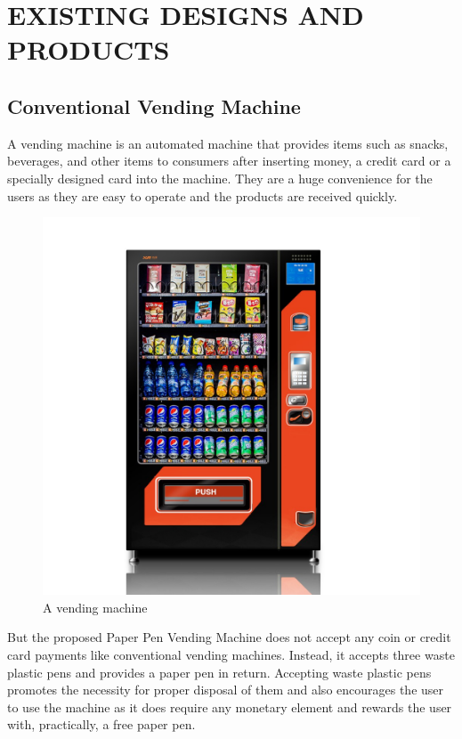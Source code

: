 \chapter{EXISTING DESIGNS AND PRODUCTS}\label{chap2}
\thispagestyle{empty}


\section{Conventional Vending Machine}
A vending machine is an automated machine that provides items such as snacks, beverages, and other items to consumers after inserting money, a credit card or a specially designed card into the machine. They are a huge convenience for the users as they are easy to operate and the products are received quickly.

\begin{figure}[h]
	\centering
	\includegraphics[width=0.85\linewidth]{./picture-files/vending_machine.jpg}
	\caption{A vending machine}
	\label{fig:VenMach}
\end{figure}

But the proposed Paper Pen Vending Machine does not accept any coin or credit card payments like conventional vending machines. Instead, it accepts three waste plastic pens and provides a paper pen in return. Accepting waste plastic pens promotes the necessity for proper disposal of them and also encourages the user to use the machine as it does require any monetary element and rewards the user with, practically, a free paper pen.

